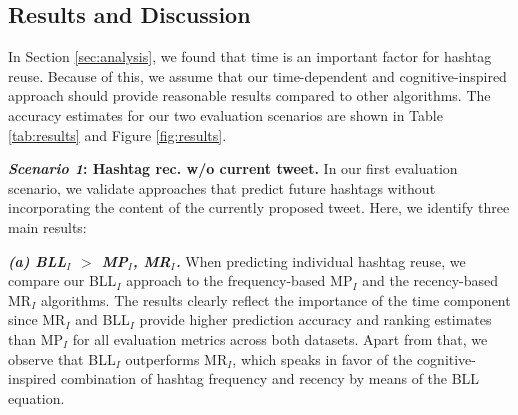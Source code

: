 \documentclass{sig-alternate-05-2015}
\newcommand{\para}[1]{\vspace{2mm}\noindent\textbf{#1}}
\newcommand{\subpara}[1]{\textit{\textbf{#1}}}
\begin{document}
\subsection{Results and Discussion} \label{sec:results}
In Section \ref{sec:analysis}, we found that time is an important factor for hashtag reuse. Because of this, we assume that our time-dependent and cognitive-inspired approach should provide reasonable results compared to other algorithms. The accuracy estimates for our two evaluation scenarios are shown in Table \ref{tab:results} and Figure \ref{fig:results}.

\begin{figure*}[t!]
   \centering
	 \captionsetup[subfigure]{justification=centering}
   \caption{Precision / Recall plots of our two evaluation scenarios showing the accuracy of BLL$_I$, BLL$_S$, CF, BLL$_{I,S}${}, SR, TCI and BLL$_{I,S,C}${} for $k$ = 1 - 10 recommended hashtags. Again, BLL$_{I,S}${} provides the best results in \textit{Scenario 1}{} and BLL$_{I,S,C}${} in \textit{Scenario 2}{}.
\vspace{-3mm}}
	 \label{fig:results}
\end{figure*}

\para{\textit{Scenario 1}{}: Hashtag rec. w/o current tweet.} In our first evaluation scenario, we validate approaches that predict future hashtags without incorporating the content of the currently proposed tweet. Here, we identify three main results:

\subpara{(a) BLL$_I$ $>$ MP$_I$, MR$_I$.} When predicting individual hashtag reuse, we compare our BLL$_I$ approach to the frequency-based MP$_I$ and the recency-based MR$_I$ algorithms. The results clearly reflect the importance of the time component since MR$_I$ and BLL$_I$ provide higher prediction accuracy and ranking estimates than MP$_I$ for all evaluation metrics across both datasets. Apart from that, we observe that BLL$_I$ outperforms MR$_I$, which speaks in favor of the cognitive-inspired combination of hashtag frequency and recency by means of the BLL equation.
\end{document}
